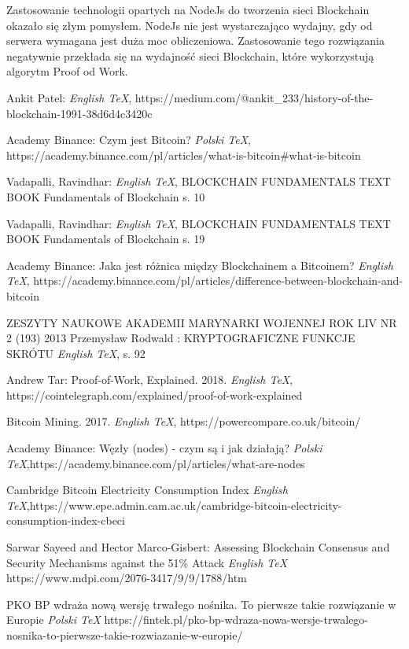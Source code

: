 \documentclass[a4paper,12pt]{book}
\begin{document}
Zastosowanie technologii opartych na NodeJs do tworzenia sieci Blockchain okazało się złym pomysłem. NodeJs nie jest wystarczająco wydajny, gdy od serwera wymagana jest duża moc obliczeniowa. Zastosowanie tego rozwiązania negatywnie przekłada się na wydajność sieci Blockchain, które wykorzystują algorytm Proof od Work.

\begin{thebibliography}{99}
 Ankit Patel:
\emph{English \TeX},
https://medium.com/@ankit\_233/history-of-the-blockchain-1991-38d6d4c3420c

 Academy Binance: Czym jest Bitcoin?
\emph{Polski \TeX},
https://academy.binance.com/pl/articles/what-is-bitcoin\#what-is-bitcoin

 Vadapalli, Ravindhar:
\emph{English \TeX},
BLOCKCHAIN FUNDAMENTALS TEXT BOOK Fundamentals of Blockchain s. 10

 Vadapalli, Ravindhar:
\emph{English \TeX},
BLOCKCHAIN FUNDAMENTALS TEXT BOOK Fundamentals of Blockchain s. 19

 Academy Binance: Jaka jest różnica między Blockchainem a Bitcoinem?
\emph{English \TeX},
https://academy.binance.com/pl/articles/difference-between-blockchain-and-bitcoin

 ZESZYTY NAUKOWE AKADEMII MARYNARKI WOJENNEJ
ROK LIV NR 2 (193) 2013  Przemysław Rodwald : KRYPTOGRAFICZNE FUNKCJE SKRÓTU
\emph{English \TeX},
 s. 92

 Andrew Tar: Proof-of-Work, Explained. 2018.
\emph{English \TeX},  https://cointelegraph.com/explained/proof-of-work-explained

 Bitcoin Mining. 2017. 
\emph{English \TeX}, https://powercompare.co.uk/bitcoin/

 Academy Binance: Węzły (nodes) - czym są i jak działają?
\emph{Polski \TeX},https://academy.binance.com/pl/articles/what-are-nodes

 Cambridge Bitcoin Electricity Consumption Index
\emph{English \TeX},https://www.epe.admin.cam.ac.uk/cambridge-bitcoin-electricity-consumption-index-cbeci

 Sarwar Sayeed and Hector Marco-Gisbert: Assessing Blockchain Consensus and Security Mechanisms against the 51\% Attack
\emph{English \TeX} https://www.mdpi.com/2076-3417/9/9/1788/htm

 PKO BP wdraża nową wersję trwałego nośnika. To pierwsze takie rozwiązanie w Europie
\emph{Polski \TeX} https://fintek.pl/pko-bp-wdraza-nowa-wersje-trwalego-nosnika-to-pierwsze-takie-rozwiazanie-w-europie/


\end{thebibliography}
\end{document}
